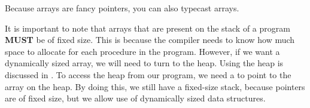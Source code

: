 Because arrays are fancy pointers, you can also typecast arrays.

It is important to note that arrays that are present on the stack of a program \textbf{MUST} be of fixed size.
This is because the compiler needs to know how much space to allocate for each procedure in the program.
However, if we want a dynamically sized array, we will need to turn to the heap.
Using the heap is discussed in .
To access the heap from our program, we need a  to point to the array on the heap.
By doing this, we still have a fixed-size stack, because pointers are of fixed size, but we allow use of dynamically sized data structures.

